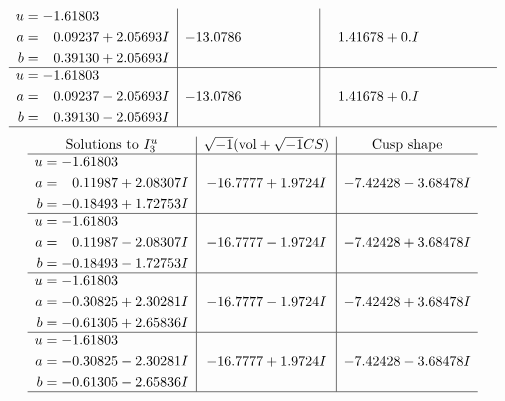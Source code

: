 \documentclass[1p]{elsarticle_modified}
\theoremstyle{definition}
\newcommand{\I}{\sqrt{-1}}
\begin{document}
$$\begin{array}{c|c|c}
\begin{aligned}
u &= -1.61803\phantom{ +0.000000I} \\
a &= \phantom{-}0.09237 + 2.05693 I \\
b &= \phantom{-}0.39130 + 2.05693 I\end{aligned}
 & -13.0786\phantom{ +0.000000I} & \phantom{-}1.41678 + 0. I\phantom{ +0.000000I} \\ \hline\begin{aligned}
u &= -1.61803\phantom{ +0.000000I} \\
a &= \phantom{-}0.09237 - 2.05693 I \\
b &= \phantom{-}0.39130 - 2.05693 I\end{aligned}
 & -13.0786\phantom{ +0.000000I} & \phantom{-}1.41678 + 0. I\phantom{ +0.000000I}\\
 \hline 
 \end{array}$$\newpage$$\begin{array}{c|c|c}  
\text{Solutions to }I^u_{3}& \I (\text{vol} + \sqrt{-1}CS) & \text{Cusp shape}\\
 \hline 
\begin{aligned}
u &= -1.61803\phantom{ +0.000000I} \\
a &= \phantom{-}0.11987 + 2.08307 I \\
b &= -0.18493 + 1.72753 I\end{aligned}
 & -16.7777 + 1.9724 I & -7.42428 - 3.68478 I \\ \hline\begin{aligned}
u &= -1.61803\phantom{ +0.000000I} \\
a &= \phantom{-}0.11987 - 2.08307 I \\
b &= -0.18493 - 1.72753 I\end{aligned}
 & -16.7777 - 1.9724 I & -7.42428 + 3.68478 I \\ \hline\begin{aligned}
u &= -1.61803\phantom{ +0.000000I} \\
a &= -0.30825 + 2.30281 I \\
b &= -0.61305 + 2.65836 I\end{aligned}
 & -16.7777 - 1.9724 I & -7.42428 + 3.68478 I \\ \hline\begin{aligned}
u &= -1.61803\phantom{ +0.000000I} \\
a &= -0.30825 - 2.30281 I \\
b &= -0.61305 - 2.65836 I\end{aligned}
 & -16.7777 + 1.9724 I & -7.42428 - 3.68478 I\\
 \hline 
 \end{array}$$\newpage
\end{document}
